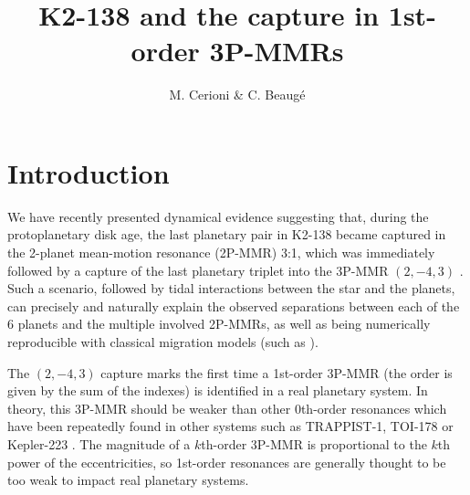 \documentclass[baaa]{baaa}
\title{K2-138 and the capture in 1st-order 3P-MMRs}
\author{
M. Cerioni\inst{1,2}
\&
C. Beaugé\inst{1,2}
}
\institute{
Observatorio Astronómico de Córdoba, UNC, Argentina
\and
Instituto de Astronomía Teórica y Experimental, CONICET--UNC, Argentina
}
\begin{document}
\maketitle
\section{Introduction}\label{S_intro}


We have recently presented dynamical evidence suggesting that, during the protoplanetary disk age, the last planetary pair in K2-138 became captured in the 2-planet mean-motion resonance (2P-MMR) 3:1, which was immediately followed by a capture of the last planetary triplet into the 3P-MMR $(2,-4,3)$ \citep{cerioni.beauge.2023}.
Such a scenario, followed by tidal interactions between the star and the planets, can precisely and naturally explain the observed separations between each of the 6 planets and the multiple involved 2P-MMRs, as well as being numerically reproducible with classical migration models (such as \citealp{tanaka.etal.2002}).

The $(2,-4,3)$ capture marks the first time a 1st-order 3P-MMR (the order is given by the sum of the indexes) is identified in a real planetary system. 
In theory, this 3P-MMR should be weaker than other 0th-order resonances which have been repeatedly found in other systems such as TRAPPIST-1, TOI-178 or Kepler-223 \citep{agol.etal.2021,leleu.etal.2021,huhn.etal.2021}.
The magnitude of a $k$th-order 3P-MMR is proportional to the $k$th power of the eccentricities, so 1st-order resonances are generally thought to be too weak to impact real planetary systems.
\end{document}
